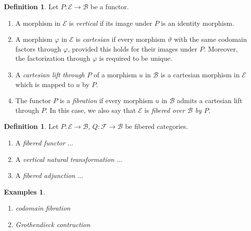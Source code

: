 \documentclass[a4paper]{amsart}
\theoremstyle{plain}
\theoremstyle{definition}
\newtheorem{definition}[theorem]{Definition}
\newtheorem{examples}[theorem]{Examples}
\begin{document}
\begin{definition}
  Let $P:ℰ → ℬ$ be a functor.
  \begin{enumerate}
    \item A morphism in $ℰ$ is \emph{vertical} if its image under $P$ is an identity morphism.
    \item A morphism $φ$ in $ℰ$ is \emph{cartesian} if every morphism $ϑ$ with the same codomain factors through $φ$, provided this holds for their images under $P$.
      Moreover, the factorization through $φ$ is required to be unique.
    \item A \emph{cartesian lift through $P$} of a morphism $u$ in $ℬ$ is a cartesian morphism in $ℰ$ which is mapped to $u$ by $P$.
    \item The functor $P$ is a \emph{fibration} if every morphism $u$ in $ℬ$ admits a cartesian lift through $P$.
      In this case, we also say that $ℰ$ is \emph{fibered over $ℬ$ by $P$}.
  \end{enumerate}
\end{definition}

\begin{definition}
  Let $P:ℰ → ℬ$, $Q:ℱ → ℬ$ be fibered categories.
  \begin{enumerate}
    \item A \emph{fibered functor} ...
    \item A \emph{vertical natural transformation} ...
    \item A \emph{fibered adjunction} ...
  \end{enumerate}
\end{definition}

\begin{examples}
  \hfill
  \begin{enumerate}
    \item \emph{codomain fibration}
    \item \emph{Grothendieck contruction}
  \end{enumerate}
\end{examples}

\nocite{*}
\printbibliography
\end{document}
